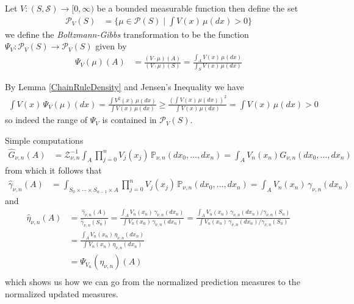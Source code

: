 \begin{defn}Let $V : (S, \mathcal{S}) \to [0,\infty)$ be a bounded measurable function then define the set
\begin{align*}
\mathcal{P}_V(S) &= \lbrace \mu \in \mathcal{P}(S) \mid \int V(x) \, \mu(dx) > 0 \rbrace
\end{align*}
we define the \emph{Boltzmann-Gibbs} transformation to be the function $\Psi_V : \mathcal{P}_V(S) \to \mathcal{P}_V(S)$ given by
\begin{align*}
\Psi_V(\mu)(A) &= \frac{(V \cdot \mu)(A)}{(V \cdot \mu)(S)} = \frac{\int_A V(x) \, \mu(dx)}{\int_S V(x) \, \mu(dx)}
\end{align*}
\end{defn}
By Lemma \ref{ChainRuleDensity} and Jensen's Inequality we have 
\begin{align*}
\int V(x) \, \Psi_V(\mu)(dx) = \frac{\int V^2(x) \, \mu(dx) }{\int V(x) \, \mu(dx)} \geq \frac{\left(\int V(x) \, \mu(dx) \right)^2}{\int V(x) \, \mu(dx)} = \int V(x) \, \mu(dx) > 0
\end{align*}
so indeed the range of $\Psi_V$ is contained in $\mathcal{P}_V(S)$.

Simple computations
\begin{align*}
\hat{G}_{\nu,n}(A) &= \mathcal{Z}_{\nu, n}^{-1} \int_A \prod_{j=0}^n V_j(x_j) \, \mathds{P}_{\nu, n}(dx_0, \dotsc, dx_n) = \int_A V_n(x_n) G_{\nu,n}(dx_0, \dotsc, dx_n)
\end{align*}
from which it follows that
\begin{align*}
\hat{\gamma}_{\nu, n} (A) &= \int_{S_0 \times \dotsb \times S_{n-1} \times A} \prod_{j=0}^n V_j(x_j) \, \mathds{P}_{\nu, n}(dx_0, \dotsc, dx_n) = \int_A V_n(x_n) \, \gamma_{\nu,n}(dx_n)
\end{align*}
and 
\begin{align*}
\hat{\eta}_{\nu, n}(A) &= \frac{\hat{\gamma}_{\nu,n}(A)}{\hat{\gamma}_{\nu,n}(S_n)} 
= \frac{\int_A V_n(x_n) \, \gamma_{\nu,n}(dx_n)}{\int V_n(x_n) \, \gamma_{\nu,n}(dx_n)} 
= \frac{\int_A V_n(x_n) \, \gamma_{\nu,n}(dx_n) / \gamma_{\nu,n}(S_n)}{\int V_n(x_n) \, \gamma_{\nu,n}(dx_n) / \gamma_{\nu,n}(S_n)} \\
&= \frac{\int_A V_n(x_n) \, \eta_{\nu,n}(dx_n)}{\int V_n(x_n) \, \eta_{\nu,n}(dx_n)} \\
&= \Psi_{V_n}(\eta_{\nu,n}) (A) \\
\end{align*}
which shows us how we can go from the normalized prediction measures to the normalized updated measures.

